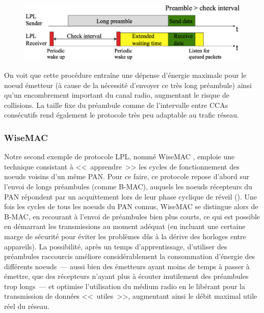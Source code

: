 \begin{figure}[!hbt]
\centering
\includegraphics[width=12.5cm]{images/ch3-b-mac.png}
\label{FigBMAC}
\end{figure}

On voit que cette procédure entraîne une dépense d'énergie maximale pour
le noeud émetteur (à cause de la nécessité d'envoyer ce très long préambule)
ainsi qu'un encombrement important du canal radio, augmentant le risque
de collisions. La taille fixe du préambule comme de l'intervalle entre CCAs
consécutifs rend également le protocole très peu adaptable au trafic réseau.

\subsubsection{WiseMAC}
\label{ParWiseMAC}

Notre second exemple de protocole LPL, nommé WiseMAC \cite{WiseMAC},
emploie une technique consistant à <<~apprendre~>> les cycles de
fonctionnement des noeuds voisins d'un même PAN. Pour ce faire, ce
protocole repose d'abord sur l'envoi de longs préambules (comme B-MAC),
auquels les noeuds récepteurs du PAN répondent par un acquittement lors
de leur phase cyclique de réveil ().
Une fois les cycles de tous les noeuds du PAN connus, WiseMAC se distingue
alors de B-MAC, en recourant à l'envoi de préambules bien plus courts,
ce qui est possible en démarrant les transmissions au moment adéquat
(en incluant une certaine marge de sécurité pour éviter les problèmes
dûs à la dérive des horloges entre appareils). La possibilité, après
un temps d'apprentissage, d'utiliser des préambules raccourcis améliore
considérablement la consommation d'énergie des différents noeuds~---
aussi bien des émetteurs ayant moins de temps à passer à émettre, que
des récepteurs n'ayant plus à écouter inutilement des préambules trop
longs~--- et optimise l'utilisation du médium radio en le libérant
pour la transmission de données <<~utiles~>>, augmentant ainsi le
débit maximal utile réel du réseau.

